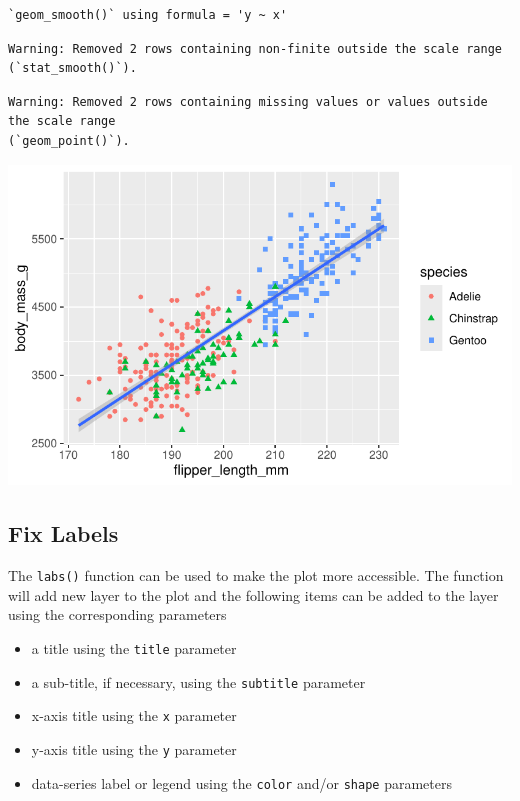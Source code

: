 \documentclass[
  letterpaper,
  DIV=11,
  numbers=noendperiod]{scrreprt}
\providecommand{\tightlist}{%
  \setlength{\itemsep}{0pt}\setlength{\parskip}{0pt}}\usepackage{longtable,booktabs,array}
\begin{document}
\begin{verbatim}
`geom_smooth()` using formula = 'y ~ x'
\end{verbatim}

\begin{verbatim}
Warning: Removed 2 rows containing non-finite outside the scale range
(`stat_smooth()`).
\end{verbatim}

\begin{verbatim}
Warning: Removed 2 rows containing missing values or values outside the scale range
(`geom_point()`).
\end{verbatim}

\includegraphics{src/r-for-data-science/01-data-viz_files/figure-pdf/unnamed-chunk-14-1.pdf}

\subsection{Fix Labels}\label{fix-labels}

The \texttt{labs()} function can be used to make the plot more
accessible. The function will add new layer to the plot and the
following items can be added to the layer using the corresponding
parameters

\begin{itemize}
\tightlist
\item
  a title using the \texttt{title} parameter
\item
  a sub-title, if necessary, using the \texttt{subtitle} parameter
\item
  x-axis title using the \texttt{x} parameter
\item
  y-axis title using the \texttt{y} parameter
\item
  data-series label or legend using the \texttt{color} and/or
  \texttt{shape} parameters
\end{itemize}
\end{document}
